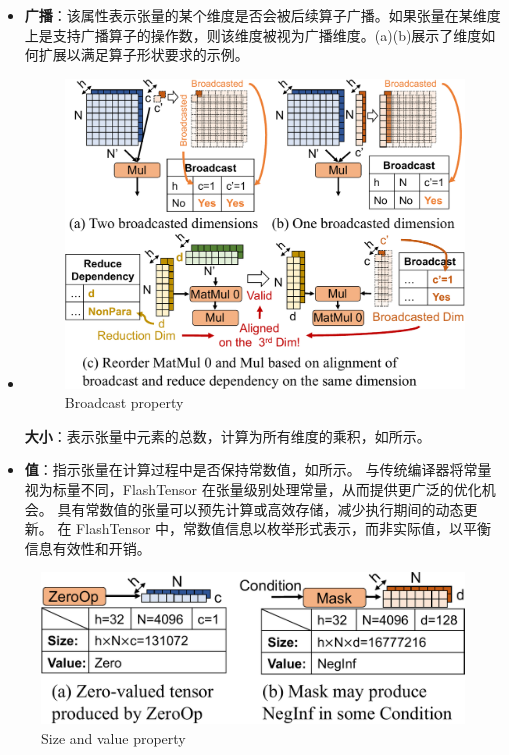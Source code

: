 \begin{itemize}
\item
\textbf{广播}：该属性表示张量的某个维度是否会被后续算子广播。如果张量在某维度上是支持广播算子的操作数，则该维度被视为广播维度。(a)(b)展示了维度如何扩展以满足算子形状要求的示例。
\item
\begin{figure}[ht]
    \centering
    \includegraphics[width=0.7\linewidth]{figures/flashtensor/property_definition_broadcast-crop.pdf}
    \caption{Broadcast property}
    \label{fig:property_definition_broadcast}
\end{figure}

\textbf{大小}：表示张量中元素的总数，计算为所有维度的乘积，如所示。
\item
\textbf{值}：指示张量在计算过程中是否保持常数值，如所示。
与传统编译器将常量视为标量不同，FlashTensor 在张量级别处理常量，从而提供更广泛的优化机会。
具有常数值的张量可以预先计算或高效存储，减少执行期间的动态更新。
在 FlashTensor 中，常数值信息以枚举形式表示，而非实际值，以平衡信息有效性和开销。
\end{itemize}





\begin{figure}[htbp]
    \centering
    \includegraphics[width=0.5\linewidth]{figures/flashtensor/property_definition_size_and_value.pdf}
    \caption{Size and value property}
    \label{fig:property_definition_size_and_value}
\end{figure}



